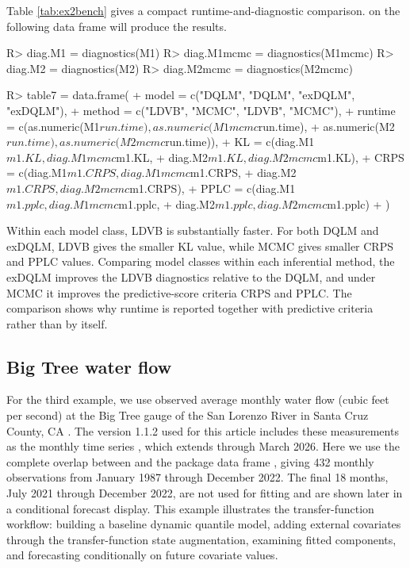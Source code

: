 \documentclass{jss}
\begin{document}
Table \ref{tab:ex2bench} gives a compact runtime-and-diagnostic comparison.  on the following data frame will produce the results. 

\begin{CodeChunk}
    \begin{CodeInput}
R> diag.M1 = diagnostics(M1)      
R> diag.M1mcmc = diagnostics(M1mcmc)  
R> diag.M2 = diagnostics(M2)      
R> diag.M2mcmc = diagnostics(M2mcmc) 

R> table7 = data.frame(
+    model   = c("DQLM", "DQLM", "exDQLM", "exDQLM"),
+    method  = c("LDVB", "MCMC", "LDVB", "MCMC"),
+    runtime = c(as.numeric(M1$run.time), as.numeric(M1mcmc$run.time),
+                as.numeric(M2$run.time), as.numeric(M2mcmc$run.time)),
+    KL      = c(diag.M1$m1.KL,   diag.M1mcmc$m1.KL,
+                diag.M2$m1.KL,   diag.M2mcmc$m1.KL),
+    CRPS    = c(diag.M1$m1.CRPS, diag.M1mcmc$m1.CRPS,
+                diag.M2$m1.CRPS, diag.M2mcmc$m1.CRPS),
+    PPLC    = c(diag.M1$m1.pplc, diag.M1mcmc$m1.pplc,
+                diag.M2$m1.pplc, diag.M2mcmc$m1.pplc)
+ )
    \end{CodeInput}
\end{CodeChunk}

Within each model class, LDVB is substantially faster. For both DQLM and exDQLM, LDVB gives the smaller KL value, while MCMC gives smaller CRPS and PPLC values. Comparing model classes within each inferential method, the exDQLM improves the LDVB diagnostics relative to the DQLM, and under MCMC it improves the predictive-score criteria CRPS and PPLC. The comparison shows why runtime is reported together with predictive criteria rather than by itself.


\subsection{Big Tree water flow}
\label{sec:ex3}


For the third example, we use observed average monthly water flow (cubic feet
per second) at the Big Tree gauge of the San Lorenzo River in Santa Cruz
County, CA \citep{btflow}. The  version 1.1.2 used for this
article includes these measurements as the monthly time series ,
which extends through March 2026. Here we use the complete overlap between
 and the package data frame ,
giving 432 monthly observations from January
1987 through December 2022. The final 18 months, July 2021 through December
2022, are not used for fitting and are shown later in a conditional forecast
display. This example illustrates the transfer-function workflow: building a
baseline dynamic quantile model, adding external covariates through the
transfer-function state augmentation, examining fitted components, and
forecasting conditionally on future covariate values.
\end{document}
